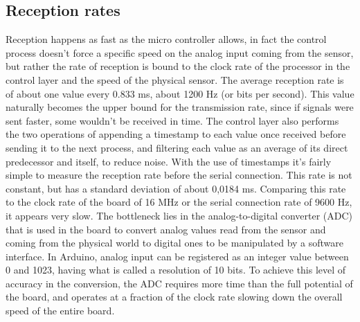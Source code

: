 \subsection{Reception rates}
\label{recrates}
Reception happens as fast as the micro controller allows, in fact the control process doesn't force a specific speed on the analog input coming from the sensor, but rather the rate of reception is bound to the clock rate of the processor in the control layer and the speed of the physical sensor.
The average reception rate is of about one value every 0.833 ms, about 1200 Hz (or bits per second).
This value naturally becomes the upper bound for the transmission rate, since if signals were sent faster, some wouldn't be received in time. 
The control layer also performs the two operations of appending a timestamp to each value once received before sending it to the next process, and filtering each value as an average of its direct predecessor and itself, to reduce noise.
With the use of timestamps it's fairly simple to measure the reception rate before the serial connection.
This rate is not constant, but has a standard deviation of about 0,0184 ms.
Comparing this rate to the clock rate of the board of 16 MHz or the serial connection rate of 9600 Hz, it appears very slow.
The bottleneck lies in the analog-to-digital converter (ADC) that is used in the board to convert analog values read from the sensor and coming from the physical world to digital ones to be manipulated by a software interface.
In Arduino, analog input can be registered as an integer value between 0 and 1023, having what is called a resolution of 10 bits.
To achieve this level of accuracy in the conversion, the ADC requires more time than the full potential of the board, and operates at a fraction of the clock rate slowing down the overall speed of the entire board.

